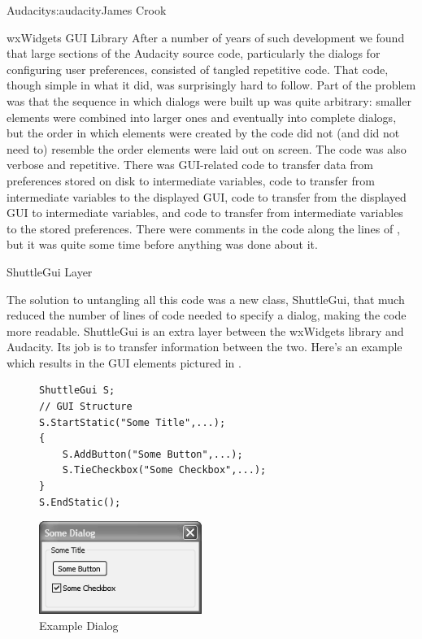 \begin{aosachapter}{Audacity}{s:audacity}{James Crook}
\begin{aosasect1}{wxWidgets GUI Library}
After a number of years of such development we found that large
sections of the Audacity source code, particularly the dialogs for
configuring user preferences, consisted of tangled repetitive code.
That code, though simple in what it did, was surprisingly hard to
follow.  Part of the problem was that the sequence in which dialogs
were built up was quite arbitrary: smaller elements were combined into
larger ones and eventually into complete dialogs, but the order in
which elements were created by the code did not (and did not need to)
resemble the order elements were laid out on screen.  The code was
also verbose and repetitive.  There was GUI-related code to transfer
data from preferences stored on disk to intermediate variables, code
to transfer from intermediate variables to the displayed GUI, code to
transfer from the displayed GUI to intermediate variables, and code to
transfer from intermediate variables to the stored preferences.  There
were comments in the code along the lines of ,
but it was quite some time before anything was done about it.

\end{aosasect1}

\begin{aosasect1}{ShuttleGui Layer}

The solution to untangling all this code was a new class, ShuttleGui,
that much reduced the number of lines of code needed to specify a
dialog, making the code more readable.  ShuttleGui is an extra layer
between the wxWidgets library and Audacity.  Its job is to transfer
information between the two.  Here's an example which results in the
GUI elements pictured in .

\begin{figure}[h!]
\begin{minipage}[b]{7cm}
\begin{verbatim}
ShuttleGui S;
// GUI Structure
S.StartStatic("Some Title",...);
{
    S.AddButton("Some Button",...);
    S.TieCheckbox("Some Checkbox",...);
}
S.EndStatic();
\end{verbatim}
\end{minipage}
\begin{minipage}[b]{7cm}
\centering
\includegraphics[width={150pt}]{../images/audacity/SomeDialog.png}
\end{minipage}
\caption{Example Dialog}
\label{fig.aud.2}
\end{figure}


\end{aosasect1}
\end{aosachapter}
